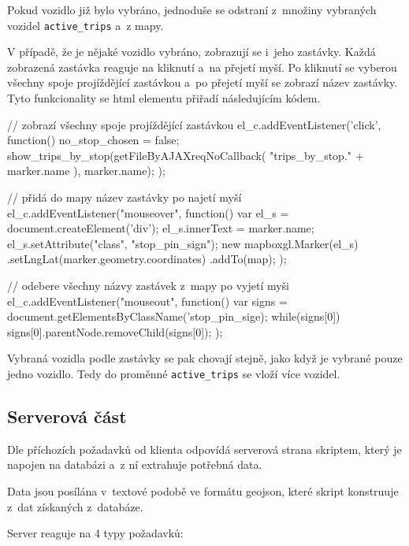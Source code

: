 \bigbreak


Pokud vozidlo již bylo vybráno, jednoduše se odstraní z~množiny vybraných vozidel \verb-active_trips- a~z mapy.


\bigbreak


V případě, že je nějaké vozidlo vybráno, zobrazují se i~jeho zastávky. Každá zobrazená zastávka reaguje na kliknutí a~na přejetí myší. Po kliknutí se vyberou všechny spoje projíždějící zastávkou a~po přejetí myší se zobrazí název zastávky. Tyto funkcionality se \gls{html} elementu přiřadí následujícím kódem.


\begin{code}[frame=none]
// zobrazí všechny spoje projíždějící zastávkou
el_c.addEventListener('click', function() {
  no_stop_chosen = false;
  show_trips_by_stop(getFileByAJAXreqNoCallback(
    "trips_by_stop." + marker.name
  ), marker.name);
});


// přidá do mapy název zastávky po najetí myší
el_c.addEventListener("mouseover", function(){
  var el_s = document.createElement('div');
  el_s.innerText = marker.name;
  el_s.setAttribute("class", "stop_pin_sign");
  new mapboxgl.Marker(el_s)
    .setLngLat(marker.geometry.coordinates)
    .addTo(map);
});


// odebere všechny názvy zastávek z~mapy po vyjetí myši
el_c.addEventListener("mouseout", function(){
  var signs = document.getElementsByClassName('stop_pin_sige);
  while(signs[0]) {
    signs[0].parentNode.removeChild(signs[0]);
  }
});
\end{code}


Vybraná vozidla podle zastávky se pak chovají stejně, jako když je vybrané pouze jedno vozidlo. Tedy do proměnné \verb-active_trips- se vloží více vozidel.


\subsection{Serverová část}

Dle příchozích požadavků od klienta odpovídá serverová strana skriptem, který je napojen na databázi a~z ní extrahuje potřebná data.


\bigbreak


Data jsou posílána v~textové podobě ve formátu \gls{geojson}, které skript konstruuje z~dat získaných z~databáze.


\bigbreak


Server reaguje na 4 typy požadavků:


